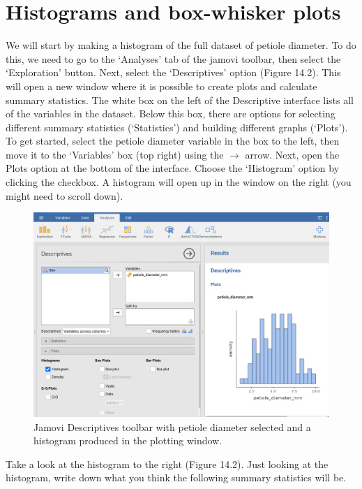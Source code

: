 \documentclass[
  openany]{krantz}
\begin{document}
\hypertarget{histograms-and-box-whisker-plots}{%
\section{Histograms and box-whisker plots}\label{histograms-and-box-whisker-plots}}

We will start by making a histogram of the full dataset of petiole diameter.
To do this, we need to go to the `Analyses' tab of the jamovi toolbar, then select the `Exploration' button.
Next, select the `Descriptives' option (Figure 14.2).
This will open a new window where it is possible to create plots and calculate summary statistics.
The white box on the left of the Descriptive interface lists all of the variables in the dataset.
Below this box, there are options for selecting different summary statistics (`Statistics') and building different graphs (`Plots').
To get started, select the petiole diameter variable in the box to the left, then move it to the `Variables' box (top right) using the \(\to\) arrow.
Next, open the Plots option at the bottom of the interface.
Choose the `Histogram' option by clicking the checkbox.
A histogram will open up in the window on the right (you might need to scroll down).

\begin{figure}
\includegraphics[width=1\linewidth]{img/lilypad_histogram} \caption{Jamovi Descriptives toolbar with petiole diameter selected and a histogram produced in the plotting window.}\label{fig:unnamed-chunk-47}
\end{figure}

Take a look at the histogram to the right (Figure 14.2).
Just looking at the histogram, write down what you think the following summary statistics will be.
\end{document}
